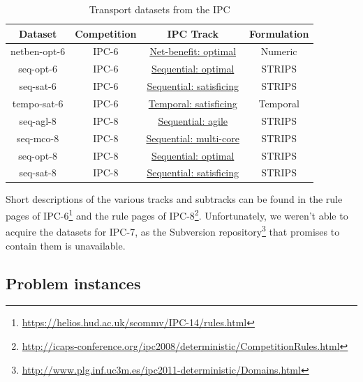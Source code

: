 \begin{table}[tb]
\begin{tabular}{c||ccc}
\textbf{Dataset} & \textbf{Competition} & \textbf{IPC Track} & \textbf{Formulation} \\ 
\hline
\hline
netben-opt-6 & IPC-6 & \href{http://icaps-conference.org/ipc2008/deterministic/NetBenefitOptimization.html}{Net-benefit: optimal} & Numeric \\ 
seq-opt-6 & IPC-6 & \href{http://icaps-conference.org/ipc2008/deterministic/SequentialOptimization.html}{Sequential: optimal} & STRIPS \\ 
seq-sat-6 & IPC-6 & \href{http://icaps-conference.org/ipc2008/deterministic/SequentialSatisficing.html}{Sequential: satisficing} & STRIPS \\ 
tempo-sat-6 & IPC-6 & \href{http://icaps-conference.org/ipc2008/deterministic/TemporalSatisficing.html}{Temporal: satisficing} & Temporal \\ 
\hline
seq-agl-8 & IPC-8 & \href{https://helios.hud.ac.uk/scommv/IPC-14/seqagi.html}{Sequential: agile} & STRIPS \\ 
seq-mco-8 & IPC-8 & \href{https://helios.hud.ac.uk/scommv/IPC-14/seqmulti.html}{Sequential: multi-core} & STRIPS \\ 
seq-opt-8 & IPC-8 & \href{https://helios.hud.ac.uk/scommv/IPC-14/seqopt.html}{Sequential: optimal} & STRIPS \\ 
seq-sat-8 & IPC-8 & \href{https://helios.hud.ac.uk/scommv/IPC-14/seqsat.html}{Sequential: satisficing} & STRIPS \\ 
\end{tabular}
\caption{Transport datasets from the IPC}
\label{tab:ipc-datasets}
\end{table}

Short descriptions of the various tracks and subtracks can be found in the rule pages of IPC-6\footnote{\url{https://helios.hud.ac.uk/scommv/IPC-14/rules.html}}
and the rule pages of IPC-8\footnote{\url{http://icaps-conference.org/ipc2008/deterministic/CompetitionRules.html}}.
Unfortunately, we weren't able to acquire the datasets for IPC-7, as the Subversion repository\footnote{\url{http://www.plg.inf.uc3m.es/ipc2011-deterministic/Domains.html}} that promises to contain them is unavailable.

\subsection{Problem instances}


